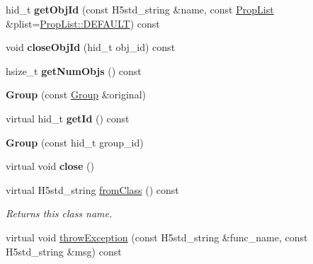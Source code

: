 \begin{DoxyCompactItemize}
\item 
\mbox{\label{class_h5_1_1_group_a520771e913143af3f752b8fbe1bde7df}} 
hid\+\_\+t {\bfseries get\+Obj\+Id} (const H5std\+\_\+string \&name, const \hyperlink{class_h5_1_1_prop_list}{Prop\+List} \&plist=\hyperlink{class_h5_1_1_prop_list_ae52af66ce82af0ea7e6dc57148c56241}{Prop\+List\+::\+D\+E\+F\+A\+U\+LT}) const
\item 
\mbox{\label{class_h5_1_1_group_a99be094b9984b238b28ebfe82a47347c}} 
void {\bfseries close\+Obj\+Id} (hid\+\_\+t obj\+\_\+id) const
\item 
\mbox{\label{class_h5_1_1_group_aaaa2c274c19f4c294a86386a956835c9}} 
hsize\+\_\+t {\bfseries get\+Num\+Objs} () const
\item 
\mbox{\label{class_h5_1_1_group_a17a49de6cbf4e29ef2fcb33d2fecbc4c}} 
{\bfseries Group} (const \hyperlink{class_h5_1_1_group}{Group} \&original)
\item 
\mbox{\label{class_h5_1_1_group_a14cb7779161455e4b31c682fd33d5a13}} 
virtual hid\+\_\+t {\bfseries get\+Id} () const
\item 
\mbox{\label{class_h5_1_1_group_a374615d1dc794c09f7cefc86d7fc7755}} 
{\bfseries Group} (const hid\+\_\+t group\+\_\+id)
\item 
\mbox{\label{class_h5_1_1_group_a4f123da519267973f895b46dd515a960}} 
virtual void {\bfseries close} ()
\item 
\mbox{\label{class_h5_1_1_group_abb4ed8f72b879befe5bd125b64c07c8a}} 
virtual H5std\+\_\+string \hyperlink{class_h5_1_1_group_abb4ed8f72b879befe5bd125b64c07c8a}{from\+Class} () const
\begin{DoxyCompactList}\small\item\em Returns this class name. \end{DoxyCompactList}\item 
\mbox{\label{class_h5_1_1_group_ae6ad54088b635a3c48f2b0eb3d51ecca}} 
virtual void \hyperlink{class_h5_1_1_group_ae6ad54088b635a3c48f2b0eb3d51ecca}{throw\+Exception} (const H5std\+\_\+string \&func\+\_\+name, const H5std\+\_\+string \&msg) const

\end{DoxyCompactItemize}

